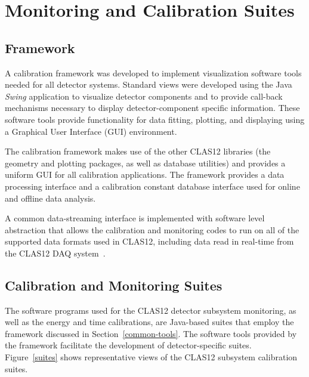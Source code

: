 \section{Monitoring and Calibration Suites}
\label{sec:calibration}

\subsection{Framework}

A calibration framework was developed to implement visualization software tools needed for all detector
systems. Standard views were developed using the Java {\it Swing} application to visualize detector components
and to provide call-back mechanisms necessary to display detector-component specific information.  These
software tools provide functionality for data fitting, plotting, and displaying using a Graphical User Interface
(GUI) environment.

The calibration framework makes use of the other CLAS12 libraries (the geometry and plotting packages, as well
as database utilities) and provides a uniform GUI for all calibration applications. The framework provides a data
processing interface and a calibration constant database interface used for online and offline data analysis.

A common data-streaming interface is implemented with software level abstraction that allows the calibration and
monitoring codes to run on all of the supported data formats used in CLAS12, including data read in real-time from
the CLAS12 DAQ system~\cite{daq-nim}.

\subsection{Calibration and Monitoring Suites}

The software programs used for the CLAS12 detector subsystem monitoring, as well as the energy and time
calibrations,  are Java-based suites that employ the framework discussed in Section~\ref{common-tools}. The
software tools provided by the framework facilitate the development of detector-specific suites.
Figure~\ref{suites} shows representative views of the CLAS12 subsystem calibration suites.

